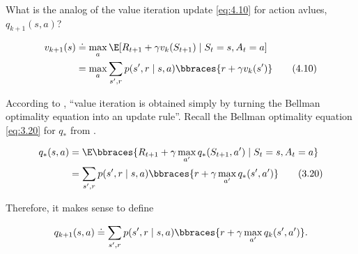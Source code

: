 
\begin{exercise}[Exercise 4.10]

What is the analog of the value iteration update \eqref{eq:4.10} for action avlues, $q_{k+1}(s, a)$?

\end{exercise}


\begin{solution}

\begin{align*}
    v_{k+1}(s)
    & \doteq
    \max_a
        \E[R_{t+1} + \gamma v_k(S_{t+1}) \mid S_t = s, A_t = a] \\
    & =
    \max_a
        \sum_{s^\prime, r}
            p(s^\prime, r \mid s, a)
            \bbraces{r + \gamma v_k(s^\prime)} \label{eq:4.10} \tag{4.10}
\end{align*}

According to \cite*[page 83]{SuttonRichardS2018Rl:a}, \enquote{value iteration is obtained simply by turning the Bellman optimality equation into an update rule}.
Recall the Bellman optimality equation \eqref{eq:3.20} for $q_\ast$ from \cite*[page 64]{SuttonRichardS2018Rl:a}.

\begin{align*}
    q_\ast(s, a)
    & =
    \E
    \bbraces
    {
        R_{t+1} + \gamma \max_{a^\prime} q_\ast(S_{t+1}, a^\prime)
        \mid
        S_t = s, A_t = a
    } \\
    & =
    \sum_{s^\prime, r}
        p(s^\prime, r \mid s, a)
        \bbraces
        {
            r + \gamma \max_{a^\prime} q_\ast(s^\prime, a^\prime)
        } \label{eq:3.20} \tag{3.20}
\end{align*}

Therefore, it makes sense to define

\begin{align*}
    q_{k+1}(s, a)
    \doteq
    \sum_{s^\prime, r}
        p(s^\prime, r \mid s, a)
        \bbraces
        {
            r + \gamma \max_{a^\prime} q_k(s^\prime, a^\prime)
        }.
\end{align*}

\end{solution}

